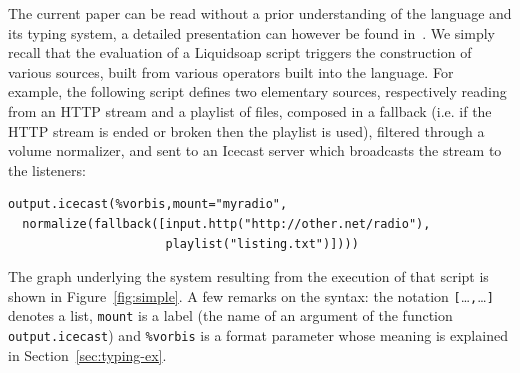 \documentclass{llncs}
\newcommand{\liquidsoap}{Liquidsoap}
\newcommand{\ie}{{i.e.}}
\newcommand{\TODO}[1]{\marginpar{\tiny #1}}
\begin{document}
The current paper can be read without a prior understanding of the language and
its typing system, a detailed presentation can however be found
in~\cite{baelde-mimram:webradio-lambda}. We simply recall that the evaluation of
a \liquidsoap{} script triggers the construction of various sources, built from
various operators built into the language.
For example, the following script defines two elementary sources, respectively 
reading from an HTTP stream and a playlist of files, composed in a fallback 
(\ie{} if the HTTP stream is ended or broken then the playlist is used), 
filtered through a volume normalizer, and sent to an Icecast server which 
broadcasts the stream to the listeners:%
\begin{verbatim}
output.icecast(%vorbis,mount="myradio",
  normalize(fallback([input.http("http://other.net/radio"),
                      playlist("listing.txt")])))
\end{verbatim}
The graph underlying the system resulting from the execution of that script is
shown in Figure~\ref{fig:simple}. A few remarks on the syntax: the notation
\hbox{\texttt{[}\ldots\texttt{,}\ldots\texttt{]}} denotes a list, \texttt{mount}
is a label (the name of an argument of the function \texttt{output.icecast}) and
\texttt{\%vorbis} is a format parameter whose meaning is explained in
Section~\ref{sec:typing-ex}.

% 
% 
\end{document}
